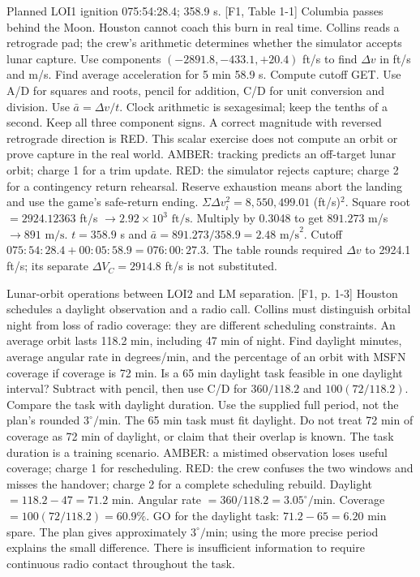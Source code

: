 {Planned LOI1 ignition 075:54:28.4; 358.9 s. [F1, Table 1-1]}
{Columbia passes behind the Moon. Houston cannot coach this burn in real
time. Collins reads a retrograde pad; the crew's arithmetic determines
whether the simulator accepts lunar capture.}
{Use components \((-2891.8,-433.1,+20.4)\) ft/s to find
\(\Delta v\) in ft/s and m/s. Find average acceleration for
5 min 58.9 s. Compute cutoff GET.}
{Use A/D for squares and roots, pencil for addition, C/D for unit
conversion and division. Use \(\bar a=\Delta v/t\).
Clock arithmetic is sexagesimal; keep the tenths of a second.}
{Keep all three component signs. A correct magnitude with reversed
retrograde direction is RED. This scalar exercise does not compute
an orbit or prove capture in the real world.}
{AMBER: tracking predicts an off-target lunar orbit; charge 1 for a
trim update. RED: the simulator rejects capture; charge 2 for a
contingency return rehearsal. Reserve exhaustion means abort the
landing and use the game's safe-return ending.}
{\(\Sigma \Delta v_i^2=8{,}550{,}499.01\) (ft/s)\(^{2}\).
Square root \(=2924.12363\) ft/s
\(\rightarrow\boxed{2.92\times10^3\text{ ft/s}}\).
Multiply by 0.3048 to get \(891.273\) m/s
\(\rightarrow\boxed{891\text{ m/s}}\).
\(t=358.9\) s and \(\bar a=891.273/358.9
=\boxed{2.48\text{ m/s}^2}\).
Cutoff \(075{:}54{:}28.4+00{:}05{:}58.9
=\boxed{076{:}00{:}27.3}\).
The table rounds required \(\Delta v\) to 2924.1 ft/s;
its separate \(\Delta V_C=2914.8\) ft/s is not substituted.}

{Lunar-orbit operations between LOI2 and LM separation. [F1, p. 1-3]}
{Houston schedules a daylight observation and a radio call.
Collins must distinguish orbital night from loss of radio coverage:
they are different scheduling constraints.}
{An average orbit lasts 118.2 min, including 47 min of night.
Find daylight minutes, average angular rate in degrees/min,
and the percentage of an orbit with MSFN coverage if coverage is
72 min. Is a 65 min daylight task feasible in one daylight interval?}
{Subtract with pencil, then use C/D for \(360/118.2\) and
\(100(72/118.2)\). Compare the task with daylight duration.
Use the supplied full period, not the plan's rounded \(3^\circ/\)min.}
{The 65 min task must fit daylight. Do not treat 72 min of coverage as
72 min of daylight, or claim that their overlap is known.
The task duration is a training scenario.}
{AMBER: a mistimed observation loses useful coverage; charge 1 for
rescheduling. RED: the crew confuses the two windows and misses the
handover; charge 2 for a complete scheduling rebuild.}
{Daylight \(=118.2-47=\boxed{71.2\text{ min}}\).
Angular rate \(=360/118.2=\boxed{3.05^\circ/\text{min}}\).
Coverage \(=100(72/118.2)=\boxed{60.9\%}\).
\(\boxed{\text{GO}}\) for the daylight task:
\(71.2-65=\boxed{6.20\text{ min}}\) spare.
The plan gives approximately \(3^\circ/\)min; using the more precise
period explains the small difference. There is insufficient information
to require continuous radio contact throughout the task.}

